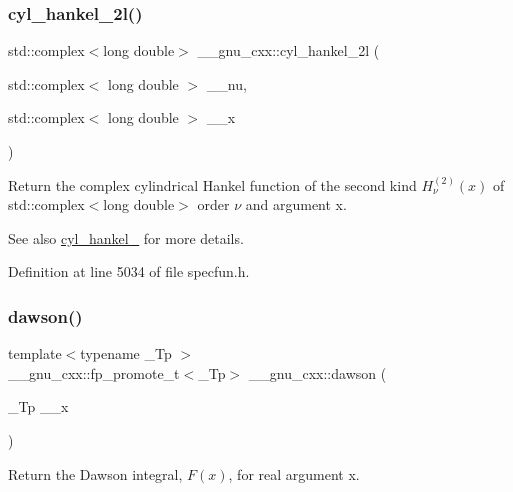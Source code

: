\subsubsection{\texorpdfstring{cyl\+\_\+hankel\+\_\+2l()}{cyl\_hankel\_2l()}\hspace{0.1cm}{\footnotesize\ttfamily [2/2]}}
{\footnotesize\ttfamily std\+::complex$<$long double$>$ \+\_\+\+\_\+gnu\+\_\+cxx\+::cyl\+\_\+hankel\+\_\+2l (\begin{DoxyParamCaption}\item[{std\+::complex$<$ long double $>$}]{\+\_\+\+\_\+nu,  }\item[{std\+::complex$<$ long double $>$}]{\+\_\+\+\_\+x }\end{DoxyParamCaption})\hspace{0.3cm}{\ttfamily [inline]}}

Return the complex cylindrical Hankel function of the second kind $ H^{(2)}_\nu(x) $ of {\ttfamily std\+::complex$<$long double$>$} order $ \nu $ and argument {\ttfamily x}.

\begin{DoxySeeAlso}{See also}
\hyperlink{group__mathsf__gnu_ga7ebc71dd48ac97255d72f5f5f43dfd8e}{cyl\+\_\+hankel\+\_} for more details. 
\end{DoxySeeAlso}


Definition at line 5034 of file specfun.\+h.

\mbox{\label{group__mathsf__gnu_gabc97cbc04fdd23593e8dccbc1421dad5}} 
\subsubsection{\texorpdfstring{dawson()}{dawson()}}
{\footnotesize\ttfamily template$<$typename \+\_\+\+Tp $>$ \\
\+\_\+\+\_\+gnu\+\_\+cxx\+::fp\+\_\+promote\+\_\+t$<$\+\_\+\+Tp$>$ \+\_\+\+\_\+gnu\+\_\+cxx\+::dawson (\begin{DoxyParamCaption}\item[{\+\_\+\+Tp}]{\+\_\+\+\_\+x }\end{DoxyParamCaption})\hspace{0.3cm}{\ttfamily [inline]}}

Return the Dawson integral, $ F(x) $, for real argument {\ttfamily x}.


